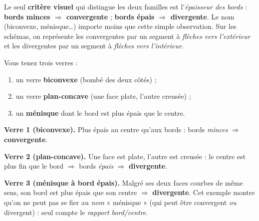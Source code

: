 \documentclass[11pt,a4paper]{article}
\begin{document}
\begin{center}
\end{center}

\begin{attention}
Le seul \textbf{critère visuel} qui distingue les deux familles est l'\emph{épaisseur des bords} :
\textbf{bords minces $\Rightarrow$ convergente} ; \textbf{bords épais $\Rightarrow$ divergente}.
Le nom (biconvexe, ménisque\ldots) importe moins que cette simple observation. Sur les schémas, on
représente les convergentes par un segment à \emph{flèches vers l'extérieur} et les divergentes par
un segment à \emph{flèches vers l'intérieur}.
\end{attention}

\begin{exemple}
Vous tenez trois verres :
\begin{enumerate}[leftmargin=1.7em,topsep=2pt,itemsep=1pt]
  \item un verre \textbf{biconvexe} (bombé des deux côtés) ;
  \item un verre \textbf{plan-concave} (une face plate, l'autre creusée) ;
  \item un \textbf{ménisque} dont le bord est plus épais que le centre.
\end{enumerate}
\textbf{Verre 1 (biconvexe).} Plus épais au centre qu'aux bords : bords \emph{minces}
$\Rightarrow$ \textbf{convergente}.

\textbf{Verre 2 (plan-concave).} Une face est plate, l'autre est creusée : le centre est plus fin que
le bord $\Rightarrow$ bords \emph{épais} $\Rightarrow$ \textbf{divergente}.

\textbf{Verre 3 (ménisque à bord épais).} Malgré ses deux faces courbes de même sens, son bord est
plus épais que son centre $\Rightarrow$ \textbf{divergente}. Cet exemple montre qu'on ne peut pas se
fier au \emph{nom} « ménisque » (qui peut être convergent \emph{ou} divergent) : seul compte le
\emph{rapport bord/centre}.
\end{exemple}
\end{document}
